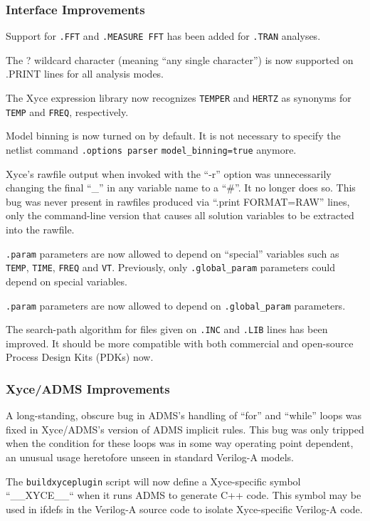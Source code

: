 \documentclass[letterpaper]{scrartcl}
\begin{document}
\subsubsection*{Interface Improvements}
\begin{XyceItemize}
  \item Support for \texttt{.FFT} and \texttt{.MEASURE FFT} has been
    added for \texttt{.TRAN} analyses.
  \item The ? wildcard character (meaning ``any single character'') is
    now supported on .PRINT lines for all analysis modes.
  \item The Xyce expression library now recognizes \texttt{TEMPER} and
    \texttt{HERTZ} as synonyms for \texttt{TEMP} and \texttt{FREQ},
    respectively.
  \item Model binning is now turned on by default.  It is not
    necessary to specify the netlist command \texttt{.options parser}
    \texttt{model\_binning=true} anymore.
  \item Xyce's rawfile output when invoked with the ``-r'' option was
    unnecessarily changing the final ``\_'' in any variable name to a
    ``\#''.  It no longer does so.  This bug was never present in
    rawfiles produced via ``.print FORMAT=RAW'' lines, only the
    command-line version that causes all solution variables to be
    extracted into the rawfile.
  \item \texttt{.param} parameters are now allowed to depend on ``special'' variables 
    such as \texttt{TEMP}, \texttt{TIME}, \texttt{FREQ} and \texttt{VT}.  
    Previously, only \texttt{.global\_param} parameters could depend on special variables. 
  \item \texttt{.param} parameters are now allowed to depend on \texttt{.global\_param} parameters.
  \item The search-path algorithm for files given on \texttt{.INC} and
     \texttt{.LIB} lines has been improved.  It should be more compatible
     with both commercial and open-source Process Design Kits (PDKs) now.
\end{XyceItemize}

\subsubsection*{Xyce/ADMS Improvements}
\begin{XyceItemize}
  \item A long-standing, obscure bug in ADMS's handling of ``for'' and
    ``while'' loops was fixed in Xyce/ADMS's version of ADMS implicit
    rules.  This bug was only tripped when the condition for these
    loops was in some way operating point dependent, an unusual usage
    heretofore unseen in standard Verilog-A models.
  \item The \texttt{buildxyceplugin} script will now define a
    Xyce-specific symbol ``\_\_XYCE\_\_`` when it runs ADMS to
    generate C++ code.  This symbol may be used in ifdefs in the
    Verilog-A source code to isolate Xyce-specific Verilog-A code.
\end{XyceItemize}
\end{document}
